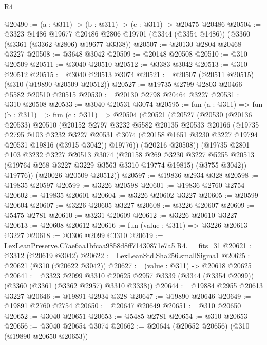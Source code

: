 \begin{lexlean}{R4}
\begin{coremodule}
@20490 := (a : @311) -> (b : @311) -> (c : @311) -> @20475 @20486
@20504 := @3323
    @1486
    @19677
    @20486
    @2806
    @19701
    (@3344 (@3354 @1486))
    (@3360 (@3361 (@3362 @2806) @19677 @3338))
@20507 := @20130 @2804 @20468 @3227
@20508 := @3648 @3042
@20509 := @20148 @20508
@20510 := @310 @20509
@20511 := @3040 @20510
@20512 := @3383 @3042
@20513 := @310 @20512
@20515 := @3040 @20513 @3074
@20521 := @20507 (@20511 @20515) (@310 (@19890 @20509 @20512))
@20527 := @19735 @2799 @2803 @20466 @5582 @20510 @20515
@20530 := @20130 @2798 @20464 @3227
@20531 := @310 @20508
@20533 := @3040 @20531 @3074
@20595 := fun (a : @311) =>
  fun (b : @311) =>
  fun (c : @311) =>
  @20504
    (@20521
      (@20527
        (@20530
          (@20136 @20533)
          @20510
          (@20152
            @2797
            @3232
            @5582
            @20135
            @20533
            @20166
            (@19735
              @2795
              @103
              @3232
              @3227
              @20531
              @3074
              (@20158 @1651 @3230 @3227 @19794 @20531 @19816 (@3915 @3042))
              @19776))
          (@20216 @20508))
        (@19735
          @2801
          @103
          @3232
          @3227
          @20513
          @3074
          (@20158
            @269
            @3230
            @3227
            @5255
            @20513
            (@19764 @268 @3227 @3229 @3563 @3310 @19774 @19815)
            (@3755 @3042))
          @19776))
      (@20026 @20509 @20512))
@20597 := @19836 @2934 @328
@20598 := @19835 @20597
@20599 := @3226 @20598
@20601 := @19836 @2760 @2754
@20602 := @19835 @20601
@20604 := @3226 @20602 @3227
@20605 := @20599 @20604
@20607 := @3226 @20605 @3227
@20608 := @3226 @20607
@20609 := @5475 @2781
@20610 := @3231 @20609
@20612 := @3226 @20610 @3227
@20613 := @20608 @20612
@20616 := fun (value : @311) => @3226 @20613 @3227
@20618 := @3306 @2099 @3310
@20619 := LexLeanPreserve.C7ae6aa1bfcaa9858d8ff71430871e7a5.R4.__fits_31
@20621 := @3312 (@20619 @3042)
@20622 := LexLeanStd.Sha256.smallSigma1
@20625 := @20621 (@310 (@20622 @3042))
@20627 := (value : @311) -> @20618 @20625
@20641 := @3323
    @2099
    @3310
    @20625
    @2957
    @3339
    (@3344 (@3354 @2099))
    (@3360 (@3361 (@3362 @2957) @3310 @3338))
@20644 := @19884 @2955 @20613 @3227
@20646 := @19891 @2934 @328
@20647 := @19890 @20646
@20649 := @19891 @2760 @2754
@20650 := @20647 @20649
@20651 := @310 @20650
@20652 := @3040 @20651
@20653 := @5485 @2781
@20654 := @310 @20653
@20656 := @3040 @20654 @3074
@20662 := @20644 (@20652 @20656) (@310 (@19890 @20650 @20653))

\end{coremodule}
\end{lexlean}
